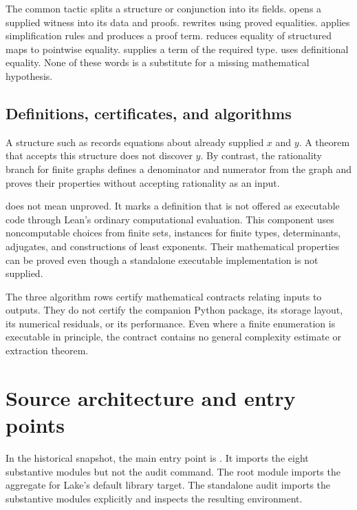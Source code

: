 The common  tactic splits a structure or conjunction into its fields.  opens a supplied witness into its data and proofs.  rewrites using proved equalities.  applies simplification rules and produces a proof term.  reduces equality of structured maps to pointwise equality.  supplies a term of the required type.  uses definitional equality. None of these words is a substitute for a missing mathematical hypothesis.

\subsection{Definitions, certificates, and algorithms}

A structure such as  records equations about already supplied $x$ and $y$. A theorem that accepts this structure does not discover $y$. By contrast, the rationality branch for finite graphs defines a denominator and numerator from the graph and proves their properties without accepting rationality as an input.

 does not mean unproved. It marks a definition that is not offered as executable code through Lean's ordinary computational evaluation. This component uses noncomputable choices from finite sets, instances for finite types, determinants, adjugates, and constructions of least exponents. Their mathematical properties can be proved even though a standalone executable implementation is not supplied.

The three algorithm rows certify mathematical contracts relating inputs to outputs. They do not certify the companion Python package, its storage layout, its numerical residuals, or its performance. Even where a finite enumeration is executable in principle, the contract contains no general complexity estimate or extraction theorem.

\section{Source architecture and entry points}\label{sec:architecture}

In the historical snapshot, the main entry point is . It imports the eight substantive modules but not the audit command. The root module  imports the aggregate for Lake's default library target. The standalone audit imports the substantive modules explicitly and inspects the resulting environment.

